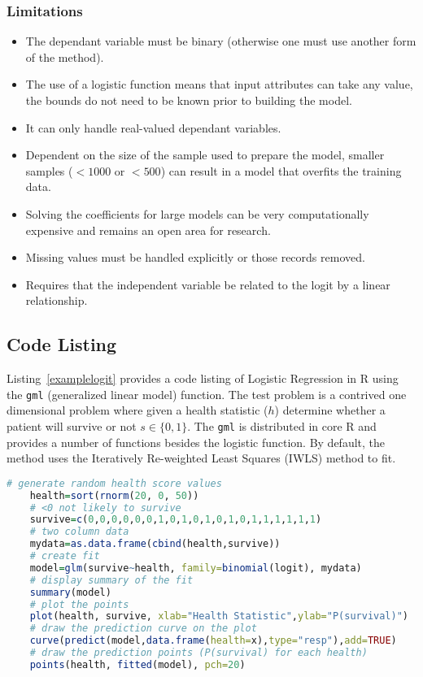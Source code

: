 \subsubsection{Limitations}

\begin{itemize}
	\item The dependant variable must be binary (otherwise one must use another form of the method).
	\item The use of a logistic function means that input attributes can take any value, the bounds do not need to be known prior to building the model.
	\item It can only handle real-valued dependant variables.
	\item Dependent on the size of the sample used to prepare the model, smaller samples ($<1000$ or $<500$) can result in a model that overfits the training data.
	\item Solving the coefficients for large models can be very computationally expensive and remains an open area for research.
	\item Missing values must be handled explicitly or those records removed.
	\item Requires that the independent variable be related to the logit by a linear relationship.
\end{itemize}


\subsection{Code Listing}
Listing~\ref{examplelogit} provides a code listing of Logistic Regression in R using the \texttt{gml} (generalized linear model) function. 
The test problem is a contrived one dimensional problem where given a health statistic ($h$) determine whether a patient will survive or not $s\in\{0,1\}$.
The \texttt{gml} is distributed in core R and provides a number of functions besides the logistic function. By default, the method uses the Iteratively Re-weighted Least Squares (IWLS) method to fit.


\begin{lstlisting}[language=r,label=examplelogit,caption={Example of Logistic Regression in R}]
	# generate random health score values
	health=sort(rnorm(20, 0, 50))
	# <0 not likely to survive
	survive=c(0,0,0,0,0,0,1,0,1,0,1,0,1,0,1,1,1,1,1,1)
	# two column data
	mydata=as.data.frame(cbind(health,survive))
	# create fit
	model=glm(survive~health, family=binomial(logit), mydata)
	# display summary of the fit
	summary(model)
	# plot the points
	plot(health, survive, xlab="Health Statistic",ylab="P(survival)")
	# draw the prediction curve on the plot
	curve(predict(model,data.frame(health=x),type="resp"),add=TRUE)
	# draw the prediction points (P(survival) for each health)
	points(health, fitted(model), pch=20)
\end{lstlisting}

